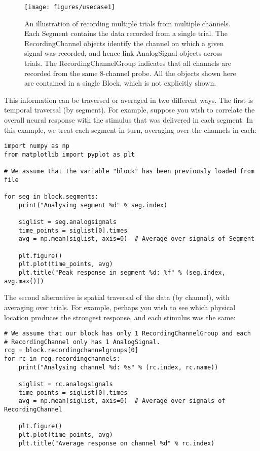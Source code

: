 \documentclass{frontiers}
\begin{document}
\begin{figure}
\centering
\texttt{[image: figures/usecase1]}
\caption{An illustration of recording multiple trials from multiple channels.  Each Segment contains the data recorded from a single trial. The RecordingChannel objects identify the channel on which a given signal was recorded, and hence link AnalogSignal objects across trials. The RecordingChannelGroup indicates that all channels are recorded from the same 8-channel probe. All the objects shown here are contained in a single Block, which is not explicitly shown.}\label{fig:usecase1} 
\end{figure}

This information can be traversed or averaged in two different ways. The first is temporal traversal (by segment). For example, suppose you wish to correlate the overall neural response with the stimulus that was delivered in each segment. In this example, we treat each segment in turn, averaging over the channels in each:

\begin{lstlisting}[style=display]
import numpy as np
from matplotlib import pyplot as plt

# We assume that the variable "block" has been previously loaded from file

for seg in block.segments:
    print("Analysing segment %d" % seg.index)

    siglist = seg.analogsignals
    time_points = siglist[0].times
    avg = np.mean(siglist, axis=0)  # Average over signals of Segment

    plt.figure()
    plt.plot(time_points, avg)
    plt.title("Peak response in segment %d: %f" % (seg.index, avg.max()))
\end{lstlisting}

The second alternative is spatial traversal of the data (by channel), with averaging over trials. For example, perhaps you wish to see which physical location produces the strongest response, and each stimulus was the same:

\begin{lstlisting}[style=display]
# We assume that our block has only 1 RecordingChannelGroup and each
# RecordingChannel only has 1 AnalogSignal.
rcg = block.recordingchannelgroups[0]
for rc in rcg.recordingchannels:
    print("Analysing channel %d: %s" % (rc.index, rc.name))

    siglist = rc.analogsignals
    time_points = siglist[0].times
    avg = np.mean(siglist, axis=0)  # Average over signals of RecordingChannel

    plt.figure()
    plt.plot(time_points, avg)
    plt.title("Average response on channel %d" % rc.index)
\end{lstlisting}
\end{document}
